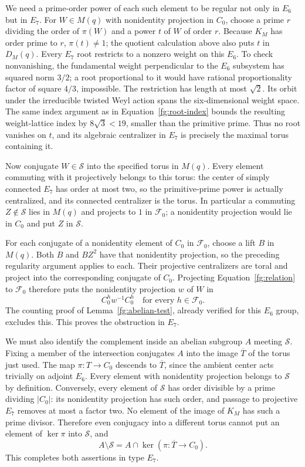 We need a prime-order power of each such element to be regular not
only in $E_6$ but in $E_7$. For $W\in M(q)$ with nonidentity projection
in $C_0$, choose a prime $r$ dividing the order of $\pi(W)$ and a
power $t$ of $W$ of order $r$. Because $K_M$ has order prime to $r$,
$\pi(t)\ne1$; the quotient calculation above also puts $t$ in $D_M(q)$.
Every $E_7$ root restricts to a nonzero weight on this $E_6$. To check
nonvanishing, the fundamental weight perpendicular to the $E_6$
subsystem has squared norm $3/2$; a root proportional to it would
have rational proportionality factor of square $4/3$, impossible.
The restriction has length at most $\sqrt2$. Its orbit under
the irreducible twisted Weyl action spans the six-dimensional
weight space. The same index argument as in
Equation~\eqref{fg:root-index} bounds the resulting
weight-lattice index by $8\sqrt3<19$, smaller than the primitive
prime. Thus no root vanishes on $t$, and its algebraic centralizer in $E_7$
is precisely the maximal torus containing it.

Now conjugate $W\in\mathcal S$ into the specified torus in $M(q)$.
Every element commuting with it projectively belongs to this
torus: the center of simply connected $E_7$ has order at most
two, so the primitive-prime power is actually centralized, and
its connected centralizer is the torus. In particular a commuting
$Z\notin\mathcal S$ lies in $M(q)$ and projects to $1$ in
$\mathcal F_0$; a nonidentity projection would lie in $C_0$ and
put $Z$ in $\mathcal S$.

For each conjugate of a nonidentity element of $C_0$ in
$\mathcal F_0$, choose a lift $B$ in $M(q)$. Both $B$ and $BZ^2$
have that nonidentity projection, so the preceding regularity
argument applies to each. Their projective centralizers are
toral and project into the corresponding conjugate of $C_0$.
Projecting Equation~\eqref{fg:relation} to $\mathcal F_0$
therefore puts the nonidentity projection $w$ of $W$ in
\[
 C_0^h w^{-1}C_0^h\quad\text{for every }h\in\mathcal F_0.
\]
The counting proof of Lemma~\ref{fg:abelian-test}, already
verified for this $E_6$ group, excludes this. This proves the
obstruction in $E_7$.

We must also identify the complement inside an abelian subgroup $A$
meeting $\mathcal S$. Fixing a member of the intersection conjugates
$A$ into the image $\overline T$ of the torus just used. The map
$\pi:T\to C_0$ descends to $\overline T$, since the ambient center
acts trivially on adjoint $E_6$. Every element with nonidentity
projection belongs to $\mathcal S$ by definition. Conversely, every
element of $\mathcal S$ has order divisible by a prime dividing
$|C_0|$: its nonidentity projection has such order, and passage to
projective $E_7$ removes at most a factor two. No element of the image of
$K_M$ has such a prime divisor. Therefore even conjugacy into a different
torus cannot put an element of $\ker\pi$ into $\mathcal S$, and
\[
 A\setminus\mathcal S=A\cap\ker(\pi:\overline T\to C_0).
\]
This completes both assertions in type $E_7$.


